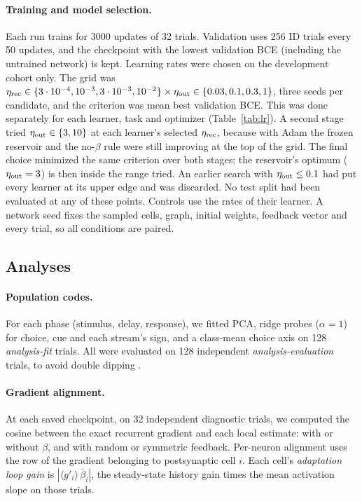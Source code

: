 \paragraph{Training and model selection.} Each run trains for 3000 updates of 32 trials.
Validation uses 256 ID trials every 50 updates, and the checkpoint with the lowest validation BCE
(including the untrained network) is kept. Learning rates were chosen on the development cohort
only. The grid was $\eta_{\rm rec}\in\{3\cdot10^{-4},10^{-3},3\cdot10^{-3},10^{-2}\}\times
\eta_{\rm out}\in\{0.03,0.1,0.3,1\}$, three seeds per candidate, and the criterion was mean best
validation BCE. This was done separately for each learner, task and optimizer
(Table~\ref{tab:lr}). A second stage tried $\eta_{\rm out}\in\{3,10\}$ at each learner's
selected $\eta_{\rm rec}$, because with Adam the frozen reservoir and the no-$\beta$ rule were
still improving at the top of the grid. The final choice minimized the same criterion over both
stages; the reservoir's optimum ($\eta_{\rm out}=3$) is then inside the range tried. An earlier
search with $\eta_{\rm out}\le0.1$ had put every learner at its upper edge and was discarded. No
test split had been evaluated at any of these points. Controls use the rates of their learner. A network seed fixes the sampled
cells, graph, initial weights, feedback vector and every trial, so all conditions are paired.

\subsection{Analyses}
\paragraph{Population codes.} For each phase (stimulus, delay, response), we fitted PCA, ridge
probes ($\alpha=1$) for choice, cue and each stream's sign, and a class-mean choice axis on 128
\emph{analysis-fit} trials. All were evaluated on 128 independent \emph{analysis-evaluation}
trials, to avoid double dipping \citep{kriegeskorte2009}.

\paragraph{Gradient alignment.} At each saved checkpoint, on 32 independent diagnostic trials, we
computed the cosine between the exact recurrent gradient and each local estimate: with or without
$\beta$, and with random or symmetric feedback. Per-neuron alignment uses the row of the gradient
belonging to postsynaptic cell $i$. Each cell's \emph{adaptation loop gain} is
$|\langle g'_i\rangle\,\bar\beta_i|$, the steady-state history gain times the mean activation
slope on those trials.

